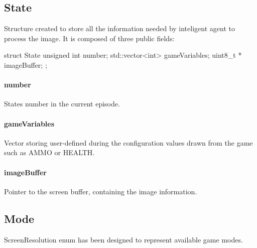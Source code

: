 \subsection{State}


Structure created to store all the information needed by inteligent agent to process the image.  
It is composed of three public fields:

\vspace{20pt}	
\begin{clinee}
	struct State {
	    unsigned int number; 
	    std::vector<int> gameVariables;
	    uint8_t * imageBuffer;
	};
\end{clinee}
\paragraph{number} States number in the current episode.
\paragraph{gameVariables} Vector storing user-defined during the configuration values drawn from the game such as AMMO or HEALTH. 
\paragraph{imageBuffer} Pointer to the screen buffer, containing the image information.

\subsection{Mode}\label{subsec:mode}
ScreenResolution enum has been designed to represent available game modes.


